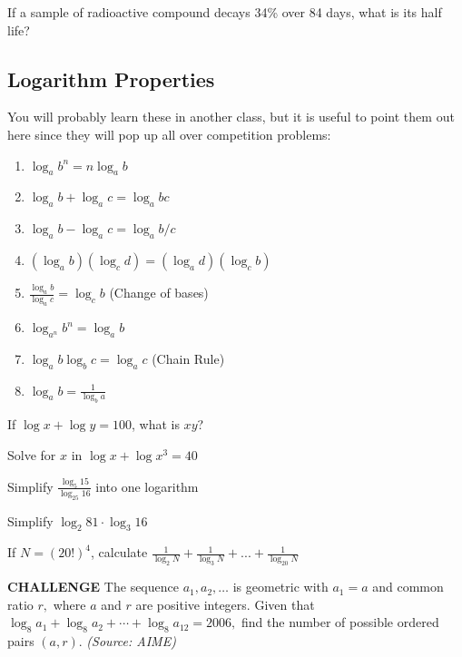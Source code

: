 	\begin{problem} If a sample of radioactive compound decays 34\% over 84 days, what is its half life? \end{problem} \vspace{.7in}
	 
	
	\subsection{Logarithm Properties}
	You will probably learn these in another class, but it is useful to point them out here since they will pop up all over competition problems:

	\begin{enumerate}
	    \item $\log_a b^n = n\log_a b$
	    \item $\log_a b + \log_a c= \log_a bc$
	    \item $\log_a b - \log_a c= \log_a b/c$
	    \item $(\log_a b)(\log_cd) = (\log_a d)(\log_cb)$
	    \item $\frac{\log_ab}{\log_ac} = \log_cb$ (Change of bases)
	    \item $\log_{a^n} b^n = \log_a b$
	    \item $\log_ab \log_bc = \log_ac$ (Chain Rule)
	    \item $\log_ab = \frac{1}{\log_ba}$
	\end{enumerate}
	
	\begin{problem} If $\log x + \log y = 100$, what is $xy$? \end{problem} \vspace{1in}
	\begin{problem}Solve for $x$ in $\log x + \log x^{3} = 40$ \end{problem} \vspace{1in}
	\begin{problem} Simplify $\frac{\log_5 15}{\log_{25} 16}$ into one logarithm \end{problem} \vspace{1in}
	\begin{problem} Simplify $\log_2 81 \cdot \log_3 16$ \end{problem} \vspace{1in}
	\begin{problem} If $N = (20!)^{4}$, calculate $\frac{1}{\log_2 N} + \frac{1}{\log_3 N} + ... +\frac{1}{\log_{20} N}$ \end{problem} \vspace{1in}
	\textbf{CHALLENGE} The sequence $a_1, a_2, \ldots$ is geometric with $a_1=a$ and common ratio $r,$ where $a$ and $r$ are positive integers. Given that $\log_8 a_1+\log_8 a_2+\cdots+\log_8 a_{12} = 2006,$ find the number of possible ordered pairs $(a,r).$ \textit{(Source: AIME)}